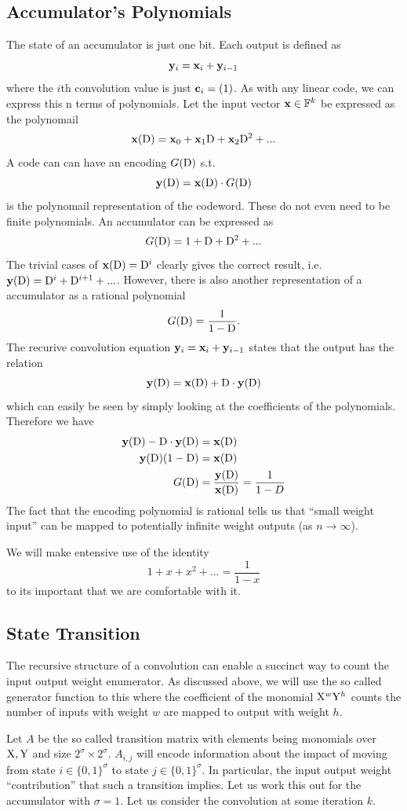 \subsection{Accumulator's Polynomials}
The state of an accumulator is just one bit. Each output is defined as 
$$
 \mathbf{y}_i = \mathbf{x}_i + \mathbf{y}_{i-1}
$$
where the $i$th convolution value is just $\mathbf{c}_i=(1)$. As with any linear code, we can express this n terms of polynomials. Let the input vector $\mathbf{x}\in \mathbb{F}^k$ be expressed as the polynomail 
$$
\mathbf{x}(\mathrm{D}) = \mathbf{x}_0 + \mathbf{x}_1\mathrm{D}+\mathbf{x}_2\mathrm{D}^2 + ...
$$
A code can can have an encoding $G(\mathrm{D})$ s.t.
$$
\mathbf{y}(\mathrm{D}) = \mathbf{x}(\mathrm{D}) \cdot G(\mathrm{D})
$$
is the polynomail representation of the codeword. These do not even need to be finite polynomials. An accumulator can be expressed as 
$$
 G(\mathrm{D}) = 1 + \mathrm{D}+\mathrm{D}^2+...
$$
The trivial cases of $\mathbf{x}(\mathrm{D})=\mathrm{D}^i$ clearly gives the correct result, i.e. $\mathbf{y}(\mathrm{D})=\mathrm{D}^i+\mathrm{D}^{i+1}+...$. However, there is also another representation of a accumulator as a rational polynomial
$$
G(\mathrm{D}) = \frac{1}{1-\mathrm{D}}.
$$
The recurive convolution equation $\mathbf{y}_i = \mathbf{x}_i + \mathbf{y}_{i-1}$ states that the output has the relation
$$
\mathbf{y}(\mathrm{D}) = \mathbf{x}(\mathrm{D}) + \mathrm{D} \cdot \mathbf{y}(\mathrm{D})
$$ which can easily be seen by simply looking at the coefficients of the polynomials. Therefore we have 
\begin{align*}
    \mathbf{y}(\mathrm{D}) - \mathrm{D} \cdot \mathbf{y}(\mathrm{D}) &= \mathbf{x}(\mathrm{D})\\
    \mathbf{y}(\mathrm{D}) (1 - \mathrm{D}) &= \mathbf{x}(\mathrm{D})\\
    G(\mathrm{D}) &=\frac{\mathbf{y}(\mathrm{D})}{\mathbf{x}(\mathrm{D})} = \frac{1}{1-D}\\
\end{align*}
The fact that the encoding polynomial is rational tells us that ``small weight input'' can be mapped to potentially infinite weight outputs (as $n\rightarrow\infty$).


We will make entensive use of the identity 
$$
1+x+x^2+... = \frac{1}{1-x}
$$
to its important that we are comfortable with it. 

\subsection{State Transition}
The recursive structure of a convolution can enable a succinct way to count the input output weight enumerator. As discussed above, we will use the so called generator function to this where the coefficient of the monomial $\mathrm{X}^w\mathrm{Y}^h$ counts the number of inputs with weight $w$ are mapped to output with weight $h$.

Let $A$ be the so called transition matrix with elements being monomials over $\mathrm{X},\mathrm{Y}$ and size $2^\sigma\times2^\sigma$. $A_{i,j}$ will encode information about the impact of moving from state $i\in\{0,1\}^\sigma$ to state $j\in \{0,1\}^\sigma$. In particular, the input output weight ``contribution'' that such a transition implies. Let us work this out for the accumulator with $\sigma=1$. Let us consider the convolution at some iteration $k$.

